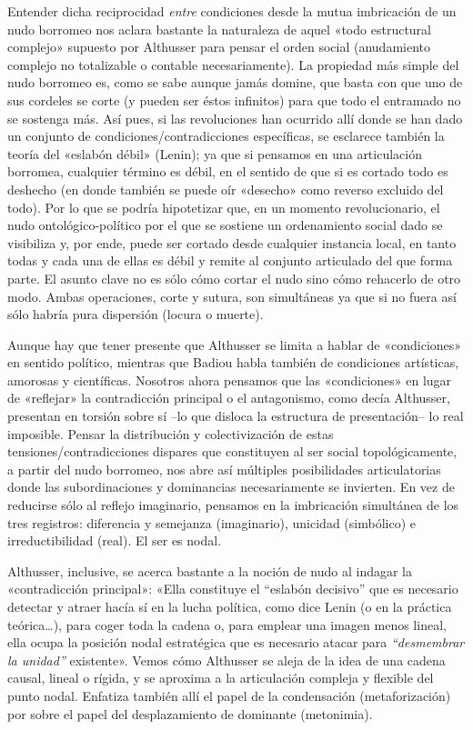 Entender dicha reciprocidad \emph{entre} condiciones desde la mutua imbricación de un nudo borromeo nos aclara bastante la naturaleza de aquel «todo estructural complejo» supuesto por Althusser para pensar el orden social (anudamiento complejo no totalizable o contable necesariamente). La propiedad más simple del nudo borromeo es, como se sabe aunque jamás domine, que basta con que uno de sus cordeles se corte (y pueden ser éstos infinitos) para que todo el entramado no se sostenga más. Así pues, si las revoluciones han ocurrido allí donde se han dado un conjunto de condiciones/contradicciones específicas, se esclarece también la teoría del «eslabón débil» (Lenin); ya que si pensamos en una articulación borromea, cualquier término es débil, en el sentido de que si es cortado todo es deshecho (en donde también se puede oír «desecho» como reverso excluido del todo). Por lo que se podría hipotetizar que, en un momento revolucionario, el nudo ontológico-político por el que se sostiene un ordenamiento social dado se visibiliza y, por ende, puede ser cortado desde cualquier instancia local, en tanto todas y cada una de ellas es débil y remite al conjunto articulado del que forma parte. El asunto clave no es sólo cómo cortar el nudo sino cómo rehacerlo de otro modo. Ambas operaciones, corte y sutura, son simultáneas ya que si no fuera así sólo habría pura dispersión (locura o muerte).

Aunque hay que tener presente que Althusser se limita a hablar de «condiciones» en sentido político, mientras que Badiou habla también de condiciones artísticas, amorosas y científicas. Nosotros ahora pensamos que las «condiciones» en lugar de «reflejar» la contradicción principal o el antagonismo, como decía Althusser, presentan en torsión sobre sí --lo que disloca la estructura de presentación-- lo real imposible. Pensar la distribución y colectivización de estas tensiones/contradicciones dispares que constituyen al ser social topológicamente, a partir del nudo borromeo, nos abre así múltiples posibilidades articulatorias donde las subordinaciones y dominancias necesariamente se invierten. En vez de reducirse sólo al reflejo imaginario, pensamos en la imbricación simultánea de los tres registros: diferencia y semejanza (imaginario), unicidad (simbólico) e irreductibilidad (real). El ser es nodal.

Althusser, inclusive, se acerca bastante a la noción de nudo al indagar la «contradicción principal»: «Ella constituye el ``eslabón decisivo'' que es necesario detectar y atraer hacía sí en la lucha política, como dice Lenin (o en la práctica teórica\ldots), para coger toda la cadena o, para emplear una imagen menos lineal, ella ocupa la posición nodal estratégica que es necesario atacar para \emph{``desmembrar la unidad''} existente». Vemos cómo Althusser se aleja de la idea de una cadena causal, lineal o rígida, y se aproxima a la articulación compleja y flexible del punto nodal. Enfatiza también allí el papel de la condensación (metaforización) por sobre el papel del desplazamiento de dominante (metonimia).

